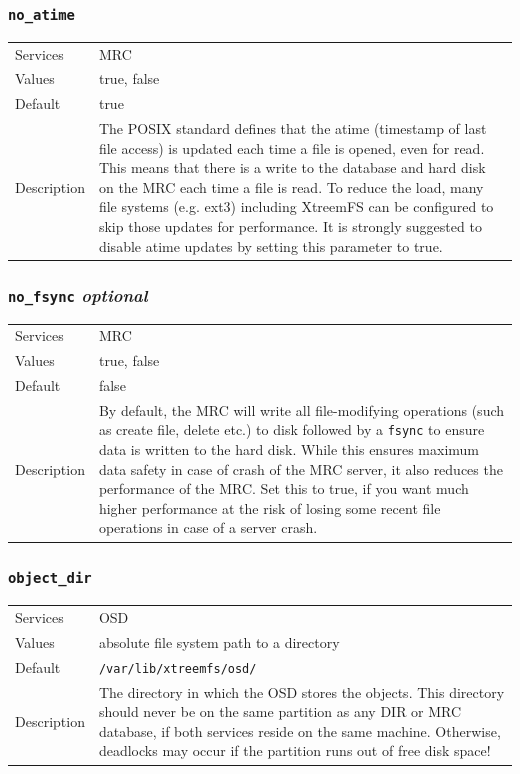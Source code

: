 \documentclass[a4paper,10pt]{book}
\begin{document}
\subsubsection{\texttt{no\_atime}}
\begin{tabular}{lp{10cm}}
 Services & MRC\\
 Values   & true, false \\
 Default  & true\\
 Description & The POSIX standard defines that the atime (timestamp of last file access) is updated each time a file is opened, even for read. This means that there is a write to the database and hard disk on the MRC each time a file is read. To reduce the load, many file systems (e.g. ext3) including XtreemFS can be configured to skip those updates for performance. It is strongly suggested to disable atime updates by setting this parameter to true.
\end{tabular}

\subsubsection{\texttt{no\_fsync} \textit{optional}}
\begin{tabular}{lp{10cm}}
 Services & MRC\\
 Values   & true, false \\
 Default  & false\\
 Description & By default, the MRC will write all file-modifying operations (such as create file, delete etc.) to disk followed by a \texttt{fsync} to ensure data is written to the hard disk. While this ensures maximum data safety in case of crash of the MRC server, it also reduces the performance of the MRC. Set this to true, if you want much higher performance at the risk of losing some recent file operations in case of a server crash.
\end{tabular}

\subsubsection{\texttt{object\_dir}}
\begin{tabular}{lp{10cm}}
 Services & OSD\\
 Values   & absolute file system path to a directory\\
 Default  & \texttt{/var/lib/xtreemfs/osd/}\\
 Description & The directory in which the OSD stores the objects. This directory should never be on the same partition as any DIR or MRC database, if both services reside on the same machine. Otherwise, deadlocks may occur if the partition runs out of free disk space!
\end{tabular}
\end{document}
